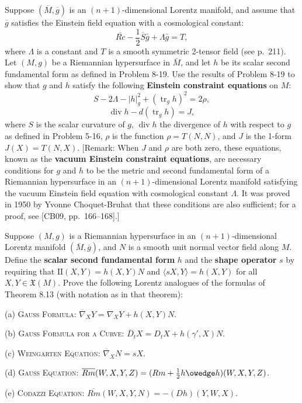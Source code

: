 \begin{exercise}
\label{prob:lorentz-einstein-field-equation}
Suppose $(\overline{M}, \overline{g})$ is an $(n + 1)$-dimensional Lorentz manifold, and assume that $\overline{g}$ satisfies the Einstein field equation with a cosmological constant:
\[
\overline{Rc} - \frac{1}{2}\overline{S}\bar{g} + \Lambda\bar{g} = T,
\]
where $\Lambda$ is a constant and $T$ is a smooth symmetric 2-tensor field (see p.\ 211). Let $(M, g)$ be a Riemannian hypersurface in $\bar{M}$, and let $h$ be its scalar second fundamental form as defined in Problem 8-19. Use the results of Problem 8-19 to show that $g$ and $h$ satisfy the following \textbf{Einstein constraint equations} on $M$:
\[
S - 2\Lambda - |h|_g^2 + (\operatorname{tr}_g h)^2 = 2\rho,
\]
\[
\operatorname{div} h - d(\operatorname{tr}_g h) = J,
\]
where $S$ is the scalar curvature of $g$, $\operatorname{div} h$ the divergence of $h$ with respect to $g$ as defined in Problem 5-16, $\rho$ is the function $\rho = T(N, N)$, and $J$ is the 1-form $J(X) = T(N, X)$. [Remark: When $J$ and $\rho$ are both zero, these equations, known as the \textbf{vacuum Einstein constraint equations}, are necessary conditions for $g$ and $h$ to be the metric and second fundamental form of a Riemannian hypersurface in an $(n+1)$-dimensional Lorentz manifold satisfying the vacuum Einstein field equation with cosmological constant $\Lambda$. It was proved in 1950 by Yvonne Choquet-Bruhat that these conditions are also sufficient; for a proof, see [CB09, pp.\ 166--168].]
\end{exercise}

\begin{exercise}
\label{prob:lorentz-hypersurface-formulas}
Suppose $(M, g)$ is a Riemannian hypersurface in an $(n + 1)$-dimensional Lorentz manifold $(\overline{M}, \overline{g})$, and $N$ is a smooth unit normal vector field along $M$. Define the \textbf{scalar second fundamental form} $h$ and the \textbf{shape operator} $s$ by requiring that $\text{II}(X, Y) = h(X, Y)N$ and $\langle sX, Y \rangle = h(X, Y)$ for all $X, Y \in \mathfrak{X}(M)$. Prove the following Lorentz analogues of the formulas of Theorem 8.13 (with notation as in that theorem):

(a) \textsc{Gauss Formula:} $\overline{\nabla}_X Y = \nabla_X Y + h(X, Y)N$.

(b) \textsc{Gauss Formula for a Curve:} $\overline{D}_t X = D_t X + h(\gamma', X)N$.

(c) \textsc{Weingarten Equation:} $\overline{\nabla}_X N = sX$.

(d) \textsc{Gauss Equation:} $\overline{Rm}(W, X, Y, Z) = (Rm + \frac{1}{2} h \owedge h)(W, X, Y, Z)$.

(e) \textsc{Codazzi Equation:} $\overline{Rm}(W, X, Y, N) = -(Dh)(Y, W, X)$.
\end{exercise}

